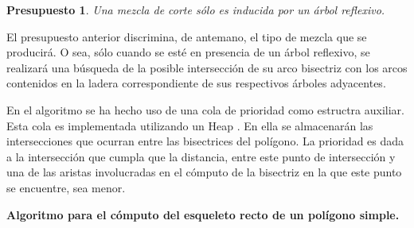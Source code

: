 \documentclass[12pt,english]{report}
\newtheorem{conjecture}[theorem]{Presupuesto}
\begin{document}
\begin{conjecture}
Una mezcla de corte s\'olo es inducida por un \'arbol reflexivo.  
\end{conjecture}

El presupuesto anterior discrimina, de antemano, el tipo de mezcla que se
producir\'{a}. O sea, s\'{o}lo cuando se est\'e en presencia de un \'{a}rbol
reflexivo, se realizar\'{a} una b\'{u}squeda de la posible intersecci\'{o}n
de su arco bisectriz con los arcos contenidos en la ladera correspondiente de sus
respectivos \'arboles adyacentes. 

En el algoritmo se ha hecho uso de una cola de prioridad como estructra auxiliar. Esta cola es implementada utilizando un Heap \cite{IA}. En ella se almacenar\'an las intersecciones que ocurran entre las bisectrices del pol\'igono. La prioridad es dada a la intersecci\'on que cumpla que la distancia, entre este punto de intersecci\'on y una de las aristas involucradas en el c\'omputo de la bisectriz en la que este punto se encuentre, sea menor.   

\begin{flushleft}
\bfseries{Algoritmo para el c\'omputo del esqueleto recto de un pol\'igono simple. }
\end{flushleft}
\end{document}
